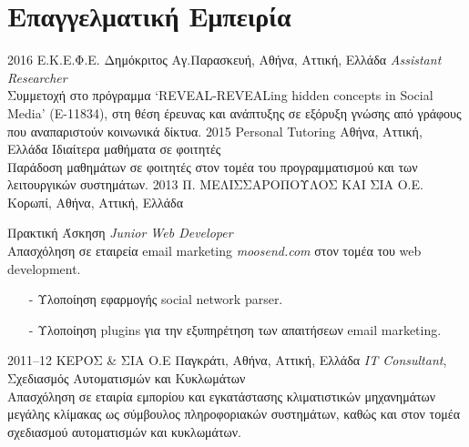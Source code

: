 \documentclass[print]{keros-cv} %
\begin{document}
\section{Επαγγελματική Εμπειρία}

\begin{entrylist}
\entry
{2016}
{Ε.Κ.Ε.Φ.Ε. Δημόκριτος}
{Αγ.Παρασκευή, Αθήνα, Αττική, Ελλάδα}
{\emph{Assistant Researcher}\\
Συμμετοχή στο πρόγραμμα `REVEAL-REVEALing hidden concepts in Social Media' (Ε-11834), στη θέση έρευνας και ανάπτυξης σε εξόρυξη γνώσης από γράφους που αναπαριστούν κοινωνικά δίκτυα.}
\entry
{2015}
{Personal Tutoring}
{Αθήνα, Αττική, Ελλάδα}
{ Ιδιαίτερα μαθήματα σε φοιτητές\\
Παράδοση μαθημάτων σε φοιτητές στον τομέα του προγραμματισμού και των λειτουργικών συστημάτων.} 
\entry
{2013}
{Π. ΜΕΛΙΣΣΑΡΟΠΟΥΛΟΣ ΚΑΙ ΣΙΑ Ο.Ε.}
{Κορωπί, Αθήνα, Αττική, Ελλάδα}
{Πρακτική Άσκηση \emph{Junior Web Developer} \\
Απασχόληση σε εταιρεία email marketing \emph{moosend.com} στον τομέα
του web development.
\begin{itemize}
\item[-] Υλοποίηση εφαρμογής social network parser. %
\item[-] Υλοποίηση plugins για την εξυπηρέτηση των απαιτήσεων email marketing. %
\end{itemize}}
\entry
{2011--12}
{ΚΕΡΟΣ \& ΣΙΑ Ο.Ε}
{Παγκράτι, Αθήνα, Αττική, Ελλάδα}
{\emph{IT Consultant}, Σχεδιασμός Αυτοματισμών και Κυκλωμάτων\\
Απασχόληση σε εταιρία εμπορίου και εγκατάστασης κλιματιστικών μηχανημάτων μεγάλης κλίμακας ως σύμβουλος πληροφοριακών συστημάτων, καθώς και στον τομέα σχεδιασμού αυτοματισμών και κυκλωμάτων.}
\end{entrylist}


\end{document}

